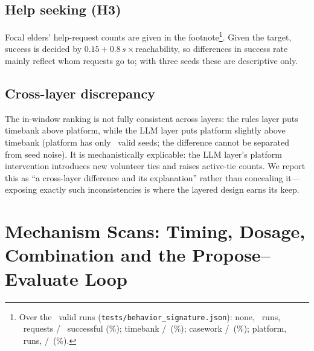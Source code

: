 \documentclass[10pt,twocolumn]{article}
\begin{document}
\subsection{Help seeking (H3)}
Focal elders' help-request counts are given in the footnote\footnote{Over the \ValidRuns\ valid runs (\texttt{tests/behavior\_signature.json}): none, \BsNNone\ runs, \BsReqNone\ requests / \BsOkNone\ successful (\BsRateNone\%); timebank \BsReqTb/\BsOkTb\ (\BsRateTb\%); casework \BsReqCw/\BsOkCw\ (\BsRateCw\%); platform, \BsNPf\ runs, \BsReqPf/\BsOkPf\ (\BsRatePf\%).}. Given the target, success is decided by $0.15+0.8\,s\times$reachability, so differences in success rate mainly reflect whom requests go to; with three seeds these are descriptive only.

\subsection{Cross-layer discrepancy}
The in-window ranking is not fully consistent across layers: the rules layer puts timebank above platform, while the LLM layer puts platform slightly above timebank (platform has only \NPlatform\ valid seeds; the difference cannot be separated from seed noise). It is mechanistically explicable: the LLM layer's platform intervention introduces new volunteer ties and raises active-tie counts. We report this as ``a cross-layer difference and its explanation'' rather than concealing it---exposing exactly such inconsistencies is where the layered design earns its keep.

\section{Mechanism Scans: Timing, Dosage, Combination and the Propose--Evaluate Loop}\label{sec:mechanism}
\end{document}
